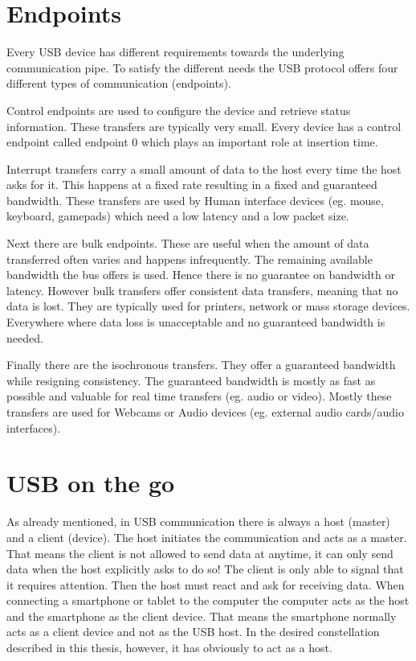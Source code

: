 \section{Endpoints}

Every USB device has different requirements towards the underlying communication pipe. To satisfy the different needs the USB protocol offers four different types of communication (endpoints).

Control endpoints are used to configure the device and retrieve status information. These transfers are typically very small. Every device has a control endpoint called endpoint 0 which plays an important role at insertion time\cite{free_usb}.

Interrupt transfers carry a small amount of data to the host every time the host asks for it. This happens at a fixed rate resulting in a fixed and guaranteed bandwidth. These transfers are used by Human interface devices (eg. mouse, keyboard, gamepads) which need a low latency and a low packet size.

Next there are bulk endpoints. These are useful when the amount of data transferred often varies and happens infrequently. The remaining available bandwidth the bus offers is used. Hence there is no guarantee on bandwidth or latency. However bulk transfers offer consistent data transfers, meaning that no data is lost. They are typically used for printers, network or mass storage devices. Everywhere where data loss is unacceptable and no guaranteed bandwidth is needed.

Finally there are the isochronous transfers. They offer a guaranteed bandwidth while resigning consistency. The guaranteed bandwidth is mostly as fast as possible and valuable for real time transfers (eg. audio or video). Mostly these transfers are used for Webcams or Audio devices (eg. external audio cards/audio interfaces)\cite{free_usb}.

\section{USB on the go}

As already mentioned, in USB communication there is always a host (master) and a client (device). The host initiates the communication and acts as a master. That means the client is not allowed to send data at anytime, it can only send data when the host explicitly asks to do so! The client is only able to signal that it requires attention. Then the host must react and ask for receiving data. When connecting a smartphone or tablet to the computer the computer acts as the host and the smartphone as the client device. That means the smartphone normally acts as a client device and not as the USB host. In the desired constellation described in this thesis, however, it has obviously to act as a host. 

